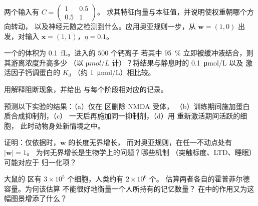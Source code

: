 \begin{exercise}[$\star\star$]\label{exo:b3:learning-memory:6}
两个输入有 $C = \begin{pmatrix}1 & 0.5\\ 0.5 & 1\end{pmatrix}$。
求其特征向量与本征值，并说明使权重朝哪个方向转动，
以及神经元随之检测到什么。应用奥亚规则一步，从 $\mathbf{w} = (1,0)$
出发，对输入 $\mathbf{x}
= (1,1)$，$\eta = 0.1$。
\end{exercise}

\begin{exercise}[$\star\star$]\label{exo:b3:learning-memory:7}
一个的体积为 \qty{0.1}{fL}。进入的 $500$ 个钙离子
若其中 \qty{95}{\%} 立即被缓冲液结合，则其游离浓度升高多少
（以 $\unit{\micro mol/L}$ 计）？将结果与静息时的 \qty{0.1}{\micro mol/L}
以及  激活因子钙调蛋白的 $K_{d}$
（约 \qty{1}{\micro mol/L}）相比较。
\end{exercise}

\begin{exercise}[$\star\star$]\label{exo:b3:learning-memory:8}
用解释阻断现象，并给出
与每个阶段相对应的记录。
\end{exercise}

\begin{exercise}[$\star\star$]\label{exo:b3:learning-memory:9}
预测以下实验的结果：（a）仅在  区删除 NMDA 受体，
（b）训练期间施加蛋白质合成抑制剂，（c）
一天后再施加同一抑制剂，（d）用
重新激活期间活跃的细胞，
此时动物身处新情境之中。
\end{exercise}

\begin{exercise}[$\star\star\star$]\label{exo:b3:learning-memory:10}
证明：仅依据时，$\mathbf{w}$ 的长度无界增长，
而对奥亚规则，在任一不动点处有 $|\mathbf{w}| = 1$。
为何无界增长是生物学上的问题？哪些机制
（突触标度、LTD、睡眠）可能对应于
归一化项？
\end{exercise}

\begin{exercise}[$\star\star\star$]\label{exo:b3:learning-memory:11}
大鼠的  区有 $3\times 10^{5}$ 个细胞，人类约有 $2\times 10^{6}$ 个。
估算两者各自的霍普菲尔德容量。为何该估算
不能很好地衡量一个人所持有的记忆数量？
在中的作用又为这幅图景增添了什么？
\end{exercise}

